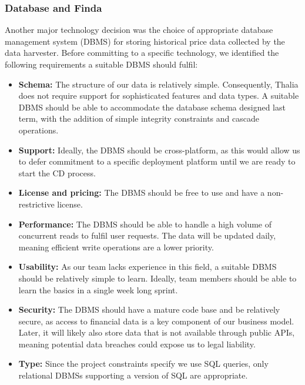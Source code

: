 \documentclass[main.tex]{subfiles}
\begin{document}
\subsubsection{Database and Finda}
\label{Finda}

Another major technology decision was the choice of appropriate database management system (DBMS) for storing historical price data collected by the data harvester. Before committing to a specific technology, we identified the following requirements a suitable DBMS should fulfil:

\begin {itemize}
    \item \textbf{Schema:} The structure of our data is relatively simple. Consequently, Thalia does not require support for sophisticated features and data types. A suitable DBMS should be able to accommodate the database schema designed last term, with the addition of simple integrity constraints and cascade operations.
    \item \textbf{Support:} Ideally, the DBMS should be cross-platform, as this would allow us to defer commitment to a specific deployment platform until we are ready to start the CD process. 
    \item \textbf{License and pricing:} The DBMS should be free to use and have a non-restrictive license.
    \item \textbf{Performance:} The DBMS should be able to handle a high volume of concurrent reads to fulfil user requests. The data will be updated daily, meaning efficient write operations are a lower priority.
    \item \textbf{Usability:} As our team lacks experience in this field, a suitable DBMS should be relatively simple to learn. Ideally, team members should be able to learn the basics in a single week long sprint.
    \item \textbf{Security:} The DBMS should have a mature code base and be relatively secure, as access to financial data is a key component of our business model. Later, it will likely also store data that is not available through public APIs, meaning potential data breaches could expose us to legal liability. \cite{dataprotectionGov}
    \item \textbf{Type:} Since the project constraints specify we use SQL queries, only relational DBMSs supporting a version of SQL are appropriate.
\end{itemize}
\end{document}
